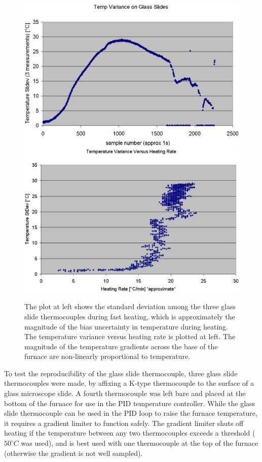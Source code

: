 \documentclass[12pt,oneside,english]{article}
\begin{document}
    \begin{figure}
    	\includegraphics[width=140mm]{images/heating_data.eps}
    	\includegraphics[width=140mm]{images/variance_vs_rate.eps}
    	\caption{The plot at left shows the standard deviation among the three glass slide thermocouples during fast heating, which is approximately the magnitude of the bias uncertainty in temperature during heating.  The temperature variance versus heating rate is plotted at left.  The magnitude of the temperature gradients across the base of the furnace are non-linearly proportional to temperature.}
    \end{figure}
    
    To test the reproducibility of the glass slide thermocouple, three glass slide thermocouples were made, by affixing a K-type thermocouple to the surface of a glass microscope slide.
    A fourth thermocouple was left bare and placed at the bottom of the furnace for use in the PID temperature controller.
    While the glass slide thermocouple can be used in the PID loop to raise the furnace temperature, it requires a gradient limiter to function safely.  
    The gradient limiter shuts off heating if the temperature between any two thermocouples exceeds a threshold ($50^{\circ}C$ was used), and is best used with one thermocouple at the top of the furnace (otherwise the gradient is not well sampled).
\end{document}
